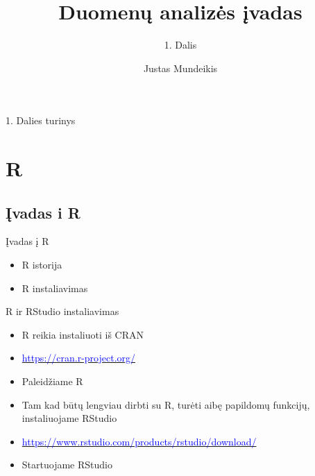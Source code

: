 \documentclass[11pt,xcolor=table]{beamer}
\author{Justas Mundeikis}
\title{Duomenų analizės įvadas}
\subtitle{1. Dalis}
\begin{document}

\begin{frame}
\titlepage
\end{frame}


\begin{frame}{1. Dalies turinys}
\tableofcontents
\end{frame}

\section{R}

\subsection{Įvadas i R}

\begin{frame}{Įvadas į R}
\begin{itemize}
\item R istorija
\item R instaliavimas
\end{itemize}
\end{frame}


\begin{frame}{R ir RStudio instaliavimas}
\begin{itemize}
\item R reikia instaliuoti iš CRAN
\item \href{https://cran.r-project.org/}{\textcolor{blue}{https://cran.r-project.org/}}
\item Paleidžiame R 
\item Tam kad būtų lengviau dirbti su R, turėti aibę papildomų funkcijų, instaliuojame RStudio
\item \href{https://www.rstudio.com/products/rstudio/download/}{\textcolor{blue}{https://www.rstudio.com/products/rstudio/download/}}
\item Startuojame RStudio
\end{itemize}
\end{frame}
\end{document}
